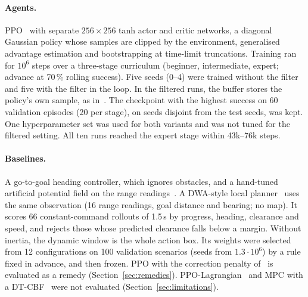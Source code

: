 \documentclass[11pt]{article}
\theoremstyle{definition}
\theoremstyle{remark}
\begin{document}
\paragraph{Agents.} PPO~\cite{schulman2017ppo} with separate $256\times256$ tanh actor and critic networks, a diagonal Gaussian policy whose samples are clipped by the environment, generalised advantage estimation and bootstrapping at time-limit truncations. Training ran for $10^6$ steps over a three-stage curriculum (beginner, intermediate, expert; advance at 70\,\% rolling success). Five seeds (0--4) were trained without the filter and five with the filter in the loop. In the filtered runs, the buffer stores the policy's own sample, as in~\cite{pizarro2025filtering}. The checkpoint with the highest success on 60 validation episodes (20 per stage), on seeds disjoint from the test seeds, was kept. One hyperparameter set was used for both variants and was not tuned for the filtered setting. All ten runs reached the expert stage within 43k--76k steps.

\paragraph{Baselines.} A go-to-goal heading controller, which ignores obstacles, and a hand-tuned artificial potential field on the range readings~\cite{koren1991potential}. A DWA-style local planner~\cite{fox1997dwa} uses the same observation (16 range readings, goal distance and bearing; no map). It scores 66 constant-command rollouts of 1.5\,s by progress, heading, clearance and speed, and rejects those whose predicted clearance falls below a margin. Without inertia, the dynamic window is the whole action box. Its weights were selected from 12 configurations on 100 validation scenarios (seeds from $1.3\cdot10^6$) by a rule fixed in advance, and then frozen. PPO with the correction penalty of~\cite{pizarro2025filtering} is evaluated as a remedy (Section~\ref{sec:remedies}). PPO-Lagrangian~\cite{stooke2020pid} and MPC with a DT-CBF~\cite{zeng2021mpcdcbf} were not evaluated (Section~\ref{sec:limitations}).
\end{document}
